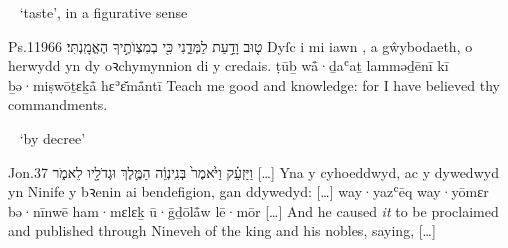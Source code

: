 \begin{frame}{\ex\  ‘taste’, in a figurative sense}
\begin{example}{Ps.}{119}{66}{}{}
	\quoling
	{ט֤וּב  וָדַ֣עַת לַמְּדֵ֑נִי כִּ֖י בְמִצְוֺתֶ֣יךָ הֶאֱמָֽנְתִּי׃}
	{Dyſc i mi iawn , a gŵybodaeth, o herwydd yn dy oꝛchymynnion di y credais.}
	{ṭūḇ  wå̄·ḏaʿaṯ lamməḏēnī kī ḇə·miṣwōṯɛḵå̄ hɛʾɛ̆må̄ntī}
	{Teach me good  and knowledge: for I have believed thy commandments.}
\end{example}
\end{frame}



\begin{frame}{\ex\  ‘by decree’}
\begin{example}{Jon.}{3}{7}{}{}
	\quoling
	{וַיַּזְעֵ֗ק וַיֹּ֙אמֶר֙ בְּנִֽינְוֵ֔ה  הַמֶּ֛לֶךְ וּגְדֹלָ֖יו לֵאמֹ֑ר […]}
	{Yna y cyhoeddwyd, ac y dywedwyd yn Ninife  y bꝛenin ai bendefigion, gan ddywedyd: […]}
	{way·yazʿēq way·yōmɛr bə·nīnwē  ham·mɛlɛḵ ū·ḡḏōlå̄w lē·mōr […]}
	{And he caused \textit{it} to be proclaimed and published through Nineveh  of the king and his nobles, saying, […]}
\end{example}
\end{frame}
